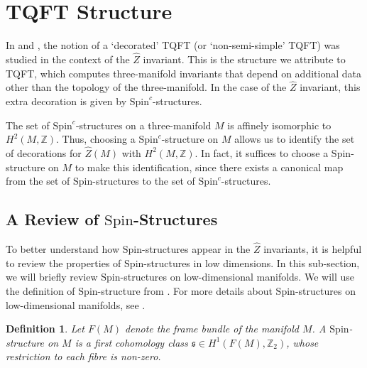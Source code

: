 \documentclass{article}
\newcommand{\Z}{{\mathbb Z}}
\newtheorem{definition}{Definition}
\numberwithin{corollary}{theorem}
\numberwithin{corollary}{proposition}
\begin{document}
\section{TQFT Structure}
In \cite{MJ} and \cite{CGP}, the notion of a `decorated' TQFT (or `non-semi-simple' TQFT) was studied in the context of the $\hat{Z}$ invariant. This is the structure we attribute to TQFT, which computes three-manifold invariants that depend on additional data other than the topology of the three-manifold. In the case of the $\hat{Z}$ invariant, this extra decoration is given by $\mathrm{Spin}^{c}$-structures. 

The set of $\mathrm{Spin}^{c}$-structures on a three-manifold $M$ is affinely isomorphic to $H^{2}(M,\Z)$. Thus, choosing a $\mathrm{Spin}^{c}$-structure on $M$ allows us to identify the set of decorations for $\hat{Z}(M)$ with $H^{2}(M,\Z)$. In fact, it suffices to choose a $\mathrm{Spin}$-structure on $M$ to make this identification, since there exists a canonical map from the set of $\mathrm{Spin}$-structures to the set of $\mathrm{Spin}^{c}$-structures.


\subsection{A Review of \texorpdfstring{$\mathrm{Spin}$-Structures}{Spin-Structures}}\label{spinstructures_review}
To better understand how $\mathrm{Spin}$-structures appear in the $\hat{Z}$ invariants, it is helpful to review the properties of $\mathrm{Spin}$-structures in low dimensions. In this sub-section, we will briefly review $\mathrm{Spin}$-structures on low-dimensional manifolds. We will use the definition of $\mathrm{Spin}$-structure from \cite{Milnor1965}. For more details about $\mathrm{Spin}$-structures on low-dimensional manifolds, see \cite{Milnor1965, AtiyahSpin, KirbyTaylor, Johnson, Beliakova1996, BM1996 }.
\begin{definition}
    Let $F(M)$ denote the frame bundle of the manifold $M$. A $\mathrm{Spin}$-structure on $M$ is a first cohomology class $\mathfrak{s}\in H^{1}(F(M),\Z_{2})$, whose restriction to each fibre is non-zero.
\end{definition}
\end{document}
